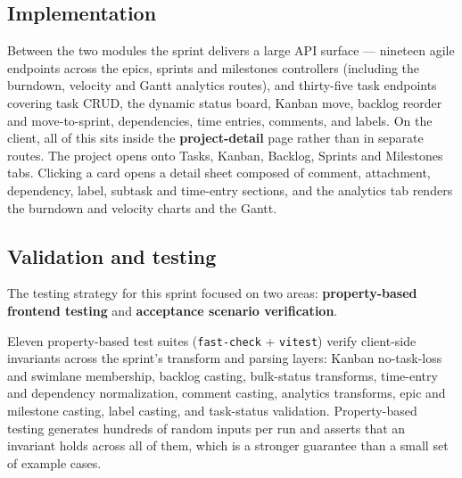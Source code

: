 
\subsection{Implementation}

Between the two modules the sprint delivers a large API surface --- nineteen agile endpoints
across the epics, sprints and milestones controllers (including the burndown, velocity and Gantt
analytics routes), and thirty-five task endpoints covering task CRUD, the dynamic status board,
Kanban move, backlog reorder and move-to-sprint, dependencies, time entries, comments, and
labels. On the client, all of this sits inside the \textbf{project-detail} page rather than in
separate routes. The project opens onto Tasks, Kanban, Backlog, Sprints and Milestones tabs.
Clicking a card opens a detail sheet composed of comment, attachment, dependency, label, subtask
and time-entry sections, and the analytics tab renders the burndown and velocity charts and the
Gantt.


\subsection{Validation and testing}

The testing strategy for this sprint focused on two areas: \textbf{property-based frontend
testing} and \textbf{acceptance scenario verification}.

Eleven property-based test suites (\texttt{fast-check} + \texttt{vitest}) verify client-side
invariants across the sprint's transform and parsing layers: Kanban no-task-loss and swimlane
membership, backlog casting, bulk-status transforms, time-entry and dependency normalization,
comment casting, analytics transforms, epic and milestone casting, label casting, and task-status
validation. Property-based testing generates hundreds of random inputs per run and asserts that
an invariant holds across all of them, which is a stronger guarantee than a small set of example
cases.

